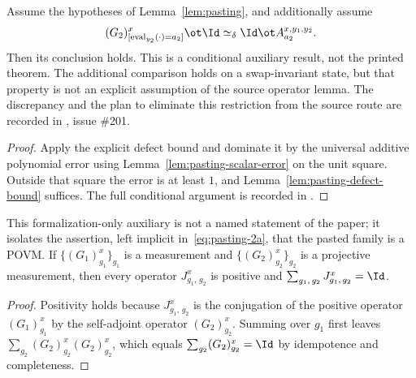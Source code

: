 \begin{lemma}
	\label{lem:pasting-of-register-exchange}
	\leanok
	Assume the hypotheses of Lemma~\ref{lem:pasting}, and additionally assume
	\begin{equation}\label{eq:pasting-1-sym}
		(G_2)^x_{[\operatorname{eval}_{y_2}(\cdot)=a_2]} \ot \Id
		\simeq_\delta \Id \ot A^{x,y_1,y_2}_{a_2}.
	\end{equation}
	Then its conclusion holds. This is a conditional auxiliary result, not the
	printed theorem. The additional comparison holds on a swap-invariant state,
	but that property is not an explicit assumption of the source operator lemma.
	The discrepancy and the plan to eliminate this restriction from the source
	route are recorded in \cite{gap:qpbt_pasting-product-error}, issue \#201.
\end{lemma}
\begin{proof}
	\leanok
	Apply the explicit defect bound and dominate it by the universal additive
	polynomial error using Lemma~\ref{lem:pasting-scalar-error} on the unit
	square. Outside that square the error is at least $1$, and
	Lemma~\ref{lem:pasting-defect-bound} suffices.
	The full conditional argument is recorded in
	\cite{gap:qpbt_pasting-product-error}.
\end{proof}

\begin{lemma}
	\label{lem:pasting-measurement}
	\leanok
	This formalization-only auxiliary is not a named statement of the paper; it
	isolates the assertion, left implicit in~\eqref{eq:pasting-2a}, that the
	pasted family is a POVM. If $\{(G_1)^x_{g_1}\}_{g_1}$ is a measurement and
	$\{(G_2)^x_{g_2}\}_{g_2}$ is a projective measurement, then every operator
	$J^x_{g_1,\,g_2}$ is positive and
	$\sum_{g_1,\,g_2} J^x_{g_1,\,g_2} = \Id$.
\end{lemma}
\begin{proof}
	\leanok {}
	Positivity holds because $J^x_{g_1,\,g_2}$ is the conjugation of the
	positive operator $(G_1)^x_{g_1}$ by the self-adjoint operator
	$(G_2)^x_{g_2}$. Summing over $g_1$ first leaves
	$\sum_{g_2} (G_2)^x_{g_2} (G_2)^x_{g_2}$, which equals
	$\sum_{g_2} (G_2)^x_{g_2} = \Id$ by idempotence and completeness.
\end{proof}

